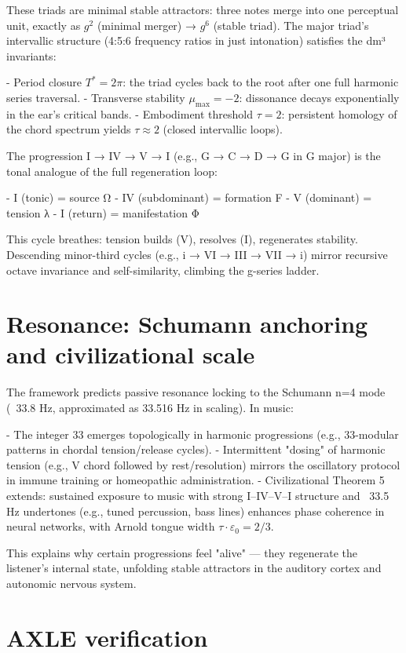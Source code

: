 \documentclass[19pt]{book}
\theoremstyle{plain}
\theoremstyle{definition}
\theoremstyle{remark}
\begin{document}
\begin{enumerate}
These triads are minimal stable attractors: three notes merge into one perceptual unit, exactly as \( g^2 \) (minimal merger) → \( g^6 \) (stable triad). The major triad's intervallic structure (4:5:6 frequency ratios in just intonation) satisfies the dm³ invariants:

- Period closure \( T^* = 2\pi \): the triad cycles back to the root after one full harmonic series traversal.
- Transverse stability \( \mu_{\max} = -2 \): dissonance decays exponentially in the ear's critical bands.
- Embodiment threshold \( \tau = 2 \): persistent homology of the chord spectrum yields \(\tau \approx 2\) (closed intervallic loops).

The progression I → IV → V → I (e.g., G → C → D → G in G major) is the tonal analogue of the full regeneration loop:

- I (tonic) = source Ω
- IV (subdominant) = formation F
- V (dominant) = tension λ
- I (return) = manifestation Φ

This cycle breathes: tension builds (V), resolves (I), regenerates stability. Descending minor-third cycles (e.g., i → VI → III → VII → i) mirror recursive octave invariance and self-similarity, climbing the g-series ladder.

\section{Resonance: Schumann anchoring and civilizational scale}

The framework predicts passive resonance locking to the Schumann n=4 mode (~33.8 Hz, approximated as 33.516 Hz in scaling). In music:

- The integer 33 emerges topologically in harmonic progressions (e.g., 33-modular patterns in chordal tension/release cycles).
- Intermittent "dosing" of harmonic tension (e.g., V chord followed by rest/resolution) mirrors the oscillatory protocol in immune training or homeopathic administration.
- Civilizational Theorem 5 extends: sustained exposure to music with strong I–IV–V–I structure and ~33.5 Hz undertones (e.g., tuned percussion, bass lines) enhances phase coherence in neural networks, with Arnold tongue width \( \tau \cdot \varepsilon_0 = 2/3 \).

This explains why certain progressions feel "alive" — they regenerate the listener's internal state, unfolding stable attractors in the auditory cortex and autonomic nervous system.

\section{AXLE verification}


\end{enumerate}
\end{document}
